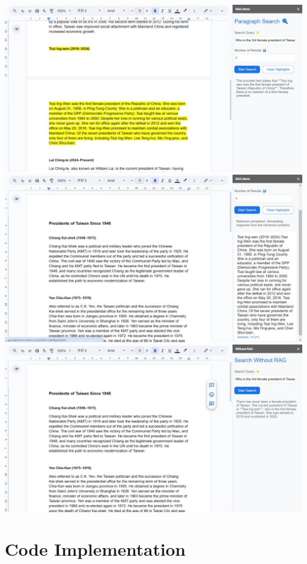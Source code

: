 \includegraphics[width=\textwidth]{screenshots/rag1.jpeg}
\includegraphics[width=\textwidth]{screenshots/rag2.jpeg}
\includegraphics[width=\textwidth]{screenshots/rag3.jpeg}


\section{Code Implementation}


